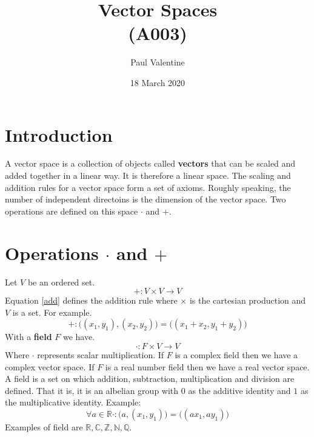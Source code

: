 \documentclass[a4paper]{article}
\title{\textbf{Vector Spaces}\\(A003)}
\author{Paul Valentine}
\date{18 March 2020}
\begin{document}
\maketitle
\section{Introduction}
A vector space is a collection of objects called \textbf{vectors} that can be scaled and added together in a linear way. It is therefore a linear space. The scaling and addition rules for a vector space form a set of axioms. Roughly speaking, the number of independent directoins is the dimension of the vector space. Two operations are defined on this space $\cdot$ and $+$.
\section{Operations $\cdot$ and $+$}
Let $V$ be an ordered set.
\label{operations}
\begin{equation}
  \label{add}
  +:V \times V \to V
\end{equation}
Equation \ref{add} defines the addition rule where $\times$ is the cartesian production\cite{A002} and $V$ is a set. For example.
\begin{equation}
  +:\big((x_1, y_1),(x_2,y_2)\big) = \big((x_1+x_2,y_1+y_2)\big)
\end{equation}
 With a \textbf{field}\cite{wiki:mathfield} $F$ we have.
\begin{equation}
  \cdot : F \times V \to V
\end{equation}
Where $\cdot$ represents scalar multiplication. If $F$ is a complex field then we have a complex vector space. If $F$ is a real number field then we have a real vector space. A field is a set on which addition, subtraction, multiplication and division are defined. That it is, it is an albelian group with $0$ as the additive identity and $1$ as the multiplicative identity. Example:
\begin{equation}
\forall a\in \mathbb{R}  \cdot:\big(a,(x_1,y_1)\big) = \big((ax_1,ay_1)\big)
\end{equation}
Examples of field are $\mathbb{R}, \mathbb{C}, \mathbb{Z}, \mathbb{N}, \mathbb{Q}$.
\end{document}
